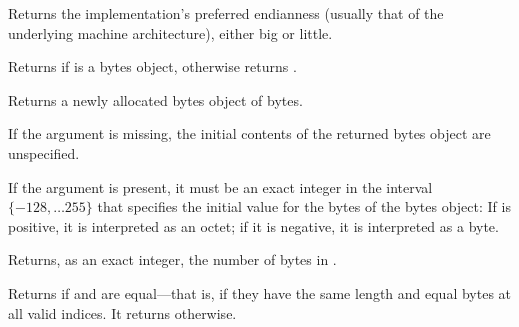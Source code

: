 \begin{entry}{%
}

Returns the implementation's preferred endianness
(usually that of the underlying machine architecture),
either {\cf big} or {\cf little}.
\end{entry}   

\begin{entry}{%
}
   
Returns \schtrue{} if  is a bytes object,
otherwise returns \schfalse{}.
\end{entry}

\begin{entry}{%
}
   
Returns a newly allocated bytes object of  bytes.
   
If the  argument is missing, the initial contents of the
returned bytes object are unspecified.
   
If the  argument is present, it must be an exact integer in
the interval $\{-128, \ldots 255\}$ that specifies the initial value
for the bytes of the bytes object: If  is positive, it is
interpreted as an octet; if it is negative, it is interpreted as a byte.
\end{entry}   

\begin{entry}{%
}
   
Returns, as an exact integer, the number of bytes in .
\end{entry}

\begin{entry}{%
}
   
Returns \schtrue{} if  and  are equal---that
is, if they have the same length and equal bytes at all valid indices.
It returns \schfalse{} otherwise.
\end{entry}

